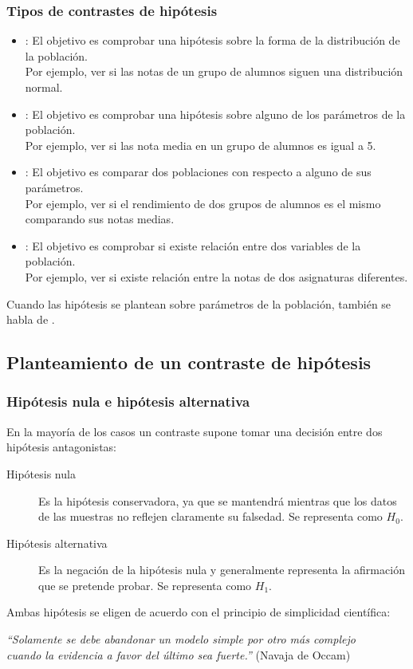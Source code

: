 \begin{frame}
\frametitle{Tipos de contrastes de hipótesis}
\begin{itemize}
\item {}: El objetivo es comprobar una hipótesis sobre la forma de la
distribución de la población.\\
Por ejemplo, ver si las notas de un grupo de alumnos siguen una distribución normal.
\item {}: El objetivo es comprobar una hipótesis sobre alguno de los parámetros
de la población.\\
Por ejemplo, ver si las nota media en un grupo de alumnos es igual a 5.
\item {}: El objetivo es comparar dos poblaciones con respecto a alguno de sus
parámetros.\\
Por ejemplo, ver si el rendimiento de dos grupos de alumnos es el mismo comparando sus notas medias. 
\item {}: El objetivo es comprobar si existe relación entre dos
variables de la población.\\
Por ejemplo, ver si existe relación entre la notas de dos asignaturas diferentes.  
\end{itemize}
Cuando las hipótesis se plantean sobre parámetros de la población, también se habla de .
\end{frame}


\subsection{Planteamiento de un contraste de hipótesis}
\begin{frame}
\frametitle{Hipótesis nula e hipótesis alternativa}
En la mayoría de los casos un contraste supone tomar una decisión entre dos hipótesis antagonistas:
\begin{description}
\item[Hipótesis nula] Es la hipótesis conservadora, ya que se mantendrá mientras que los datos de las muestras
no reflejen claramente su falsedad. Se representa como $H_0$.
\item[Hipótesis alternativa] Es la negación de la hipótesis nula y generalmente representa la afirmación que se
pretende probar. Se representa como $H_1$.
\end{description}

Ambas hipótesis se eligen de acuerdo con el principio de simplicidad científica: 
\begin{center}
\emph{``Solamente se debe abandonar un modelo simple por otro más complejo\\
cuando la evidencia a favor del último sea fuerte.''} (Navaja de Occam)
\end{center}
\end{frame}


